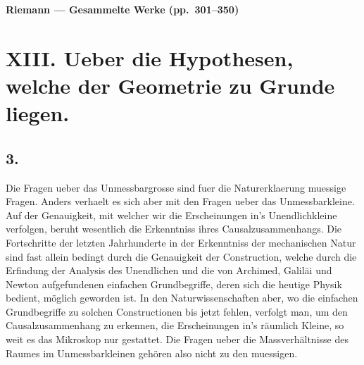 \documentclass[12pt,a4paper]{article}
\begin{document}
\begin{center}
\Large\bfseries Riemann --- Gesammelte Werke (pp.~301--350)
\end{center}

\tableofcontents
\newpage

\section*{XIII. Ueber die Hypothesen, welche der Geometrie zu Grunde liegen.}

\subsection*{3.}


Die Fragen ueber das Unmessbargrosse sind fuer die Naturerklaerung muessige Fragen. Anders verhaelt es sich aber mit den Fragen ueber das Unmessbarkleine. Auf der Genauigkeit, mit welcher wir die Erscheinungen in's Unendlichkleine verfolgen, beruht wesentlich die Erkenntniss ihres Causalzusammenhangs. Die Fortschritte der letzten Jahrhunderte in der Erkenntniss der mechanischen Natur sind fast allein bedingt durch die Genauigkeit der Construction, welche durch die Erfindung der Analysis des Unendlichen und die von Archimed, Galil\"ai und Newton aufgefundenen einfachen Grundbegriffe, deren sich die heutige Physik bedient, m\"oglich geworden ist. In den Naturwissenschaften aber, wo die einfachen Grundbegriffe zu solchen Constructionen bis jetzt fehlen, verfolgt man, um den Causalzusammenhang zu erkennen, die Erscheinungen in's r\"aumlich Kleine, so weit es das Mikroskop nur gestattet. Die Fragen ueber die Massverh\"altnisse des Raumes im Unmessbarkleinen geh\"oren also nicht zu den muessigen.
\end{document}
